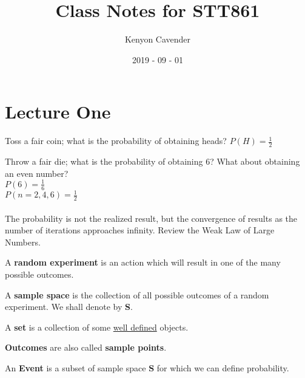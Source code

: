 \documentclass[12pt, oneside, letterpaper]{notes}
\begin{document}
\title{Class Notes for STT861}
\author{Kenyon Cavender}
\date{2019 - 09 - 01}
\maketitle

\section{Lecture One}

\begin{myex}
  Toss a fair coin; what is the probability of obtaining heads? 
  $P(H) = \frac{1}{2}$
\end{myex}

\begin{myex}
  Throw a fair die; what is the probability of obtaining 6?  
  What about obtaining an even number? \\
\indent$P(6) = \frac{1}{6}$ \\
\indent$P(n = 2,4,6) = \frac{1}{2}$ 
\end{myex}

\paragraph{}
  The probability is not the realized result, but the 
  convergence of results as the number of iterations approaches 
  infinity.  Review the Weak Law of Large Numbers.

\begin{mydef}
  A \textbf{random experiment} is an action which will result 
  in one of the many possible outcomes. 
\end{mydef}

\begin{mydef}
  A \textbf{sample space} is the collection of all possible 
  outcomes of a random experiment.  We shall denote by \textbf{S}.
\end{mydef}

\begin{mydef}
  A \textbf{set} is a collection of some \underline{well defined} 
  objects.
\end{mydef}

\begin{mydef}
  \textbf{Outcomes} are also called \textbf{sample points}.
\end{mydef}

\begin{mydef}
  An \textbf{Event} is a subset of sample space \textbf{S} for 
  which we can define probability.
\end{mydef}
\end{document}
